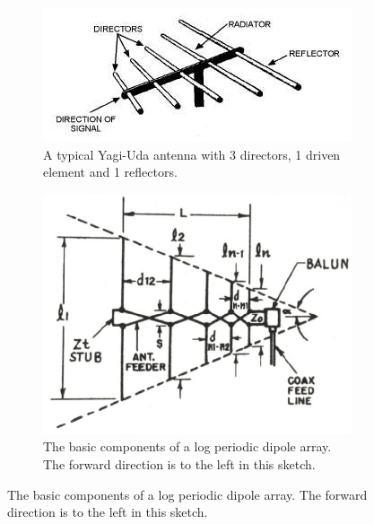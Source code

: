 \begin{figure}[h]
\centering
    \begin{subfigure}{.49\textwidth}
    \captionsetup{width=0.8\textwidth}
        \centering
        \includegraphics[width=1\textwidth]{figures/Yannis/yagi.jpg}
        \caption{A typical Yagi-Uda antenna with 3 directors, 1 driven element and 1 reflectors.}
        \label{Yagi}
    \end{subfigure}
    \begin{subfigure}{.49\textwidth}
        \captionsetup{width=0.8\textwidth}
        \centering
        \includegraphics[width=0.7\linewidth]{figures/Yannis/log2.jpg}
        \caption{The basic components of a log periodic dipole array. The forward direction is to the left in this sketch.}
        \label{log}
    \end{subfigure}
\end{figure}

